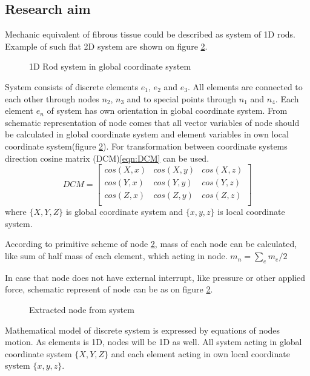 \subsection*{Research aim}
Mechanic equivalent of fibrous tissue could be described as system of 1D rods.
Example of such flat 2D system are shown on figure \ref{fig:nodeExtract}.
\begin{figure}[H]
  \centering
  \caption{1D Rod system in global coordinate system}\label{fig:rodSystem}      
\end{figure} 
System consists of discrete elements $e_1$, $e_2$ and $e_3$. All elements are
connected to each other through nodes $n_2$, $n_3$ and to special points through
$n_1$ and $n_4$. Each element $e_n$ of system has own orientation in global
coordinate system. 
From schematic representation of node comes that all vector variables of node should be calculated
 in global coordinate system and element variables in own local coordinate system(figure
 \ref{fig:nodeExtract}). For transformation between coordinate systems direction cosine matrix
 (DCM)\eqref{eqn:DCM} can be used.
\begin{equation}\label{eqn:DCM}
  DCM= \begin{bmatrix}
    cos(X,x)&cos(X,y)&cos(X,z)\\
    cos(Y,x)&cos(Y,y)&cos(Y,z)\\
    cos(Z,x)&cos(Z,y)&cos(Z,z)\\
   \end{bmatrix} 
\end{equation}
where $\{X, Y, Z\}$ is global coordinate system and $\{x,y,z\}$ is local coordinate
system.\par According to primitive scheme of node \ref{fig:nodeExtract}, mass of
each node can be calculated, like sum of half mass of each element, which acting
in node. $m_n=\sum_{e}m_e/2$\par
In case that node does not have external interrupt, like pressure or other
 applied force, schematic represent of node can be as on figure
 \ref{fig:nodeExtract}.\par
\begin{figure}[H]
  \centering
  \caption{Extracted node from system}\label{fig:nodeExtract}
\end{figure}
Mathematical model of discrete system is expressed by equations of nodes motion.
As elements is 1D, nodes will be 1D as well. All system acting in global
coordinate system $\{X, Y, Z\}$ and each element acting in own local coordinate
system $\{x,y,z\}$.